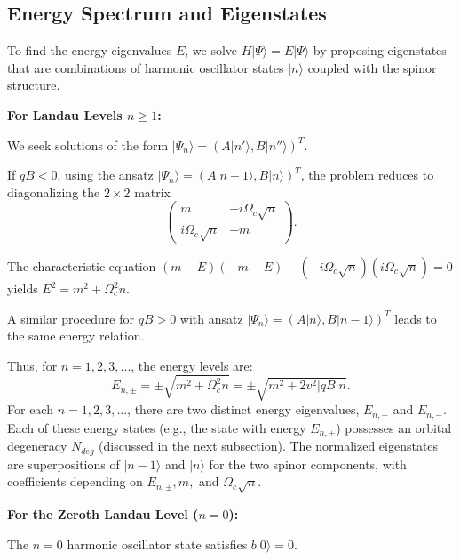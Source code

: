 \documentclass[11pt]{article}
\begin{document}
\subsection{Energy Spectrum and Eigenstates}
To find the energy eigenvalues $E$, we solve $H |\Psi\rangle = E |\Psi\rangle$ by proposing eigenstates that are combinations of harmonic oscillator states $|n\rangle$ coupled with the spinor structure.

\textbf{For Landau Levels $n \ge 1$:}

We seek solutions of the form $|\Psi_n\rangle = (A |n'\rangle, B |n''\rangle)^T$.

If $qB < 0$, using the ansatz $|\Psi_n\rangle = (A |n-1\rangle, B |n\rangle)^T$, the problem reduces to diagonalizing the $2 \times 2$ matrix 
$$\begin{pmatrix} m & -i \Omega_c \sqrt{n} \\ i \Omega_c \sqrt{n} & -m \end{pmatrix}.$$

The characteristic equation $(m-E)(-m-E) - (-i\Omega_c\sqrt{n})(i\Omega_c\sqrt{n}) = 0$ yields $E^2 = m^2 + \Omega_c^2 n$.

A similar procedure for $qB > 0$ with ansatz $|\Psi_n\rangle = (A |n\rangle, B |n-1\rangle)^T$ leads to the same energy relation.

Thus, for $n = 1, 2, 3, ...$, the energy levels are:
\begin{equation}
E_{n, \pm} = \pm \sqrt{m^2 + \Omega_c^2 n} = \boxed{\pm \sqrt{m^2 + 2 v^2 |qB| n}}.
\end{equation}
For each $n = 1, 2, 3, ...$, there are two distinct energy eigenvalues, $E_{n,+}$ and $E_{n,-}$. Each of these energy states (e.g., the state with energy $E_{n,+}$) possesses an orbital degeneracy $N_{deg}$ (discussed in the next subsection). The normalized eigenstates are superpositions of $|n-1\rangle$ and $|n\rangle$ for the two spinor components, with coefficients depending on $E_{n,\pm}, m,$ and $\Omega_c\sqrt{n}$.

\textbf{For the Zeroth Landau Level ($n=0$):}

The $n=0$ harmonic oscillator state satisfies $b|0\rangle=0$.
\end{document}
